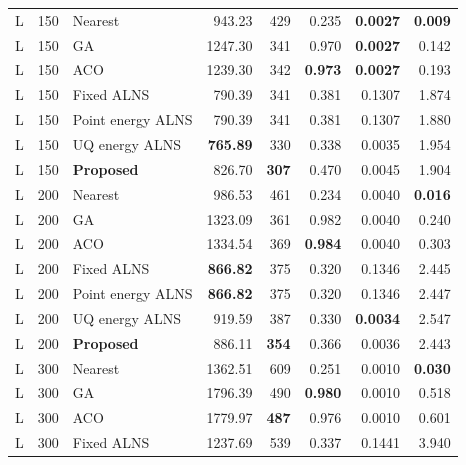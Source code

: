 \begin{longtable}{@{}rrlrrrrr@{}}
L & 150 & Nearest & 943.23 & 429 & 0.235 & \textbf{0.0027} & \textbf{0.009} \\

L & 150 & GA & 1247.30 & 341 & 0.970 & \textbf{0.0027} & 0.142 \\

L & 150 & ACO & 1239.30 & 342 & \textbf{0.973} & \textbf{0.0027} & 0.193 \\

L & 150 & Fixed ALNS & 790.39 & 341 & 0.381 & 0.1307 & 1.874 \\

L & 150 & Point energy ALNS & 790.39 & 341 & 0.381 & 0.1307 & 1.880 \\

L & 150 & UQ energy ALNS & \textbf{765.89} & 330 & 0.338 & 0.0035 & 1.954 \\
\rowcolor{gray!10}
L & 150 & \textbf{Proposed} & 826.70 & \textbf{307} & 0.470 & 0.0045 & 1.904 \\
\addlinespace[2pt]

L & 200 & Nearest & 986.53 & 461 & 0.234 & 0.0040 & \textbf{0.016} \\

L & 200 & GA & 1323.09 & 361 & 0.982 & 0.0040 & 0.240 \\

L & 200 & ACO & 1334.54 & 369 & \textbf{0.984} & 0.0040 & 0.303 \\

L & 200 & Fixed ALNS & \textbf{866.82} & 375 & 0.320 & 0.1346 & 2.445 \\

L & 200 & Point energy ALNS & \textbf{866.82} & 375 & 0.320 & 0.1346 & 2.447 \\

L & 200 & UQ energy ALNS & 919.59 & 387 & 0.330 & \textbf{0.0034} & 2.547 \\
\rowcolor{gray!10}
L & 200 & \textbf{Proposed} & 886.11 & \textbf{354} & 0.366 & 0.0036 & 2.443 \\
\addlinespace[2pt]

L & 300 & Nearest & 1362.51 & 609 & 0.251 & 0.0010 & \textbf{0.030} \\

L & 300 & GA & 1796.39 & 490 & \textbf{0.980} & 0.0010 & 0.518 \\

L & 300 & ACO & 1779.97 & \textbf{487} & 0.976 & 0.0010 & 0.601 \\

L & 300 & Fixed ALNS & 1237.69 & 539 & 0.337 & 0.1441 & 3.940 \\


\end{longtable}
